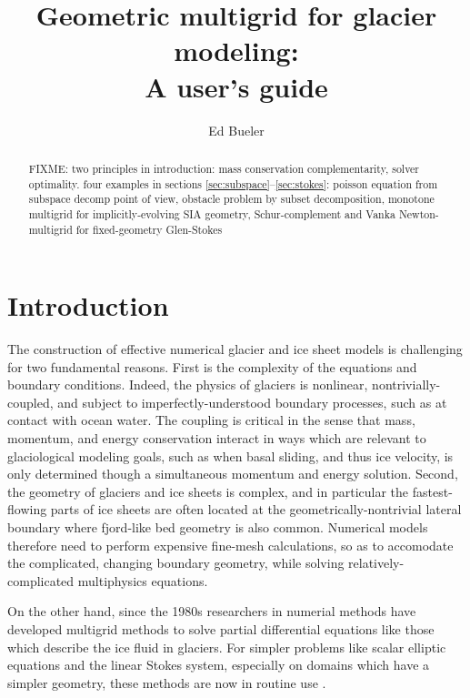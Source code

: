 \documentclass[letterpaper,final,12pt,reqno]{amsart}
\begin{document}
\title[Geometric multigrid for glacier modeling]{Geometric multigrid for glacier modeling: \\ A user's guide}

\author{Ed Bueler}

\begin{abstract} FIXME: two principles in introduction: mass conservation complementarity, solver optimality.  four examples in sections \ref{sec:subspace}--\ref{sec:stokes}: poisson equation from subspace decomp point of view, obstacle problem by subset decomposition, monotone multigrid for implicitly-evolving SIA geometry, Schur-complement and Vanka Newton-multigrid for fixed-geometry Glen-Stokes
\end{abstract}

\maketitle

\tableofcontents

\thispagestyle{empty}
\bigskip

\section{Introduction} \label{sec:intro}

The construction of effective numerical glacier and ice sheet models is challenging for two fundamental reasons.  First is the complexity of the equations and boundary conditions.  Indeed, the physics of glaciers is nonlinear, nontrivially-coupled, and subject to imperfectly-understood boundary processes, such as at contact with ocean water.  The coupling is critical in the sense that mass, momentum, and energy conservation interact in ways which are relevant to glaciological modeling goals, such as when basal sliding, and thus ice velocity, is only determined though a simultaneous momentum and energy solution.  Second, the geometry of glaciers and ice sheets is complex, and in particular the fastest-flowing parts of ice sheets are often located at the geometrically-nontrivial lateral boundary where fjord-like bed geometry is also common.  Numerical models therefore need to perform expensive fine-mesh calculations, so as to accomodate the complicated, changing boundary geometry, while solving relatively-complicated multiphysics equations.

On the other hand, since the 1980s researchers in numerial methods have developed multigrid methods to solve partial differential equations like those which describe the ice fluid in glaciers.   For simpler problems like scalar elliptic equations and the linear Stokes system, especially on domains which have a simpler geometry, these methods are now in routine use \cite{Briggsetal2000,Bueler2021,Trottenbergetal2001}.
\end{document}
